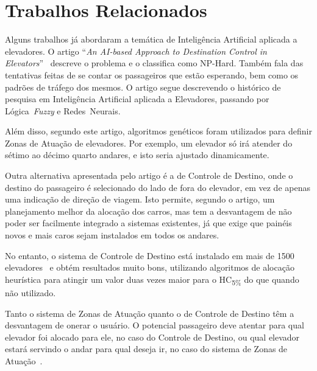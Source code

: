 \chapter{\label{chap:related}Trabalhos Relacionados}

Alguns trabalhos já abordaram a temática de Inteligência Artificial aplicada a
elevadores. O artigo ``\textit{An AI-based Approach to Destination Control in
  Elevators}''~\cite{KOEHLEROTTIGER02} descreve o problema e o classifica como
NP-Hard. Também fala das tentativas feitas de se contar os passageiros que estão
esperando, bem como os padrões de tráfego dos mesmos. O artigo segue descrevendo
o histórico de pesquisa em Inteligência Artificial aplicada a Elevadores,
passando por Lógica~\textit{Fuzzy} e Redes~Neurais. 

Além disso, segundo este artigo, algoritmos genéticos foram utilizados para definir Zonas de
Atuação de elevadores. Por exemplo, um elevador só irá atender do sétimo ao
décimo quarto andares, e isto seria ajustado dinamicamente.

Outra alternativa apresentada pelo artigo é a de Controle de Destino, onde o
destino do passageiro é selecionado do lado de fora do elevador, em vez de
apenas uma indicação de direção de viagem. Isto permite, segundo o artigo, um
planejamento melhor da alocação dos carros, mas tem a desvantagem de não poder
ser facilmente integrado a sistemas existentes, já que exige que painéis novos e
mais caros sejam instalados em todos os andares.

No entanto, o sistema de Controle de Destino está instalado em mais de 1500
elevadores~\cite{KOEHLEROTTIGER02} e obtém resultados muito bons, utilizando
algoritmos de alocação heurística para atingir um valor duas vezes maior para o
HC\textsubscript{5\%} do que quando não utilizado.

Tanto o sistema de Zonas de Atuação quanto o de Controle de Destino têm a
desvantagem de onerar o usuário. O potencial passageiro deve atentar para qual
elevador foi alocado para ele, no caso do Controle de Destino, ou qual elevador
estará servindo o andar para qual deseja ir, no caso do sistema de Zonas de Atuação~\cite{KOEHLERROTTIGER02}.
